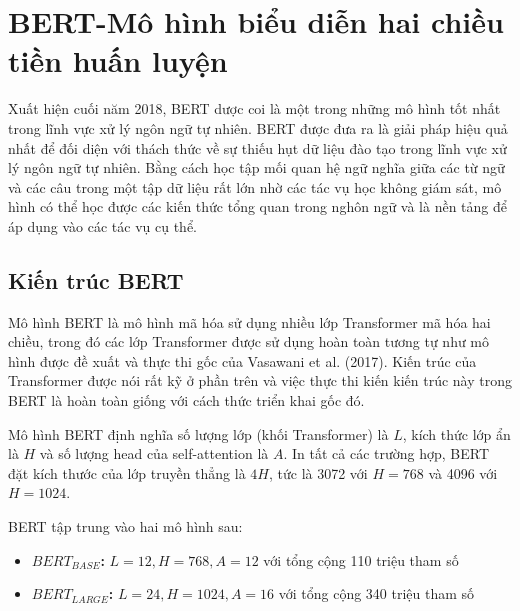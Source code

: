 \documentclass[14pt]{extreport}
\begin{document}
\section{BERT-Mô hình biểu diễn hai chiều tiền huấn luyện}
Xuất hiện cuối năm 2018, BERT dược coi là một trong những mô hình tốt nhất trong lĩnh vực xử lý ngôn ngữ tự nhiên. BERT được đưa ra là giải pháp hiệu quả nhất để đối diện với thách thức về sự thiếu hụt dữ liệu đào tạo trong lĩnh vực xử lý ngôn ngữ tự nhiên. Bằng cách học tập mối quan hệ ngữ nghĩa giữa các từ ngữ và các câu trong một tập dữ liệu rất lớn nhờ các tác vụ học không giám sát, mô hình có thể học được các kiến thức tổng quan trong nghôn ngữ và là nền tảng để áp dụng vào các tác vụ cụ thể.
\subsection{Kiến trúc BERT}
Mô hình BERT là mô hình mã hóa sử dụng nhiều lớp Transformer mã hóa hai chiều, trong đó các lớp Transformer được sử dụng hoàn toàn tương tự như mô hình được đề xuất và thực thi gốc của Vasawani et al. (2017). Kiến trúc của Transformer được nói rất kỹ ở phần trên và việc thực thi kiến kiến trúc này trong BERT là hoàn toàn giống với cách thức triển khai gốc đó.

Mô hình BERT định nghĩa số lượng lớp (khối Transformer) là $L$, kích thức lớp ẩn là $H$ và số lượng head của self-attention là $A$. In tất cả các trường hợp, BERT đặt kích thước của lớp truyền thẳng là $4H$, tức là 3072 với $H= 768$ và 4096 với $H=1024$.

BERT tập trung vào hai mô hình sau:
\begin{itemize}
    \item \textbf{$BERT_{BASE}$:} $L=12, H=768, A=12$  với tổng cộng 110 triệu tham số
    \item \textbf{$BERT_{LARGE}$: } $L=24,H=1024,A=16$  với tổng cộng 340 triệu tham số
\end{itemize}
\end{document}
